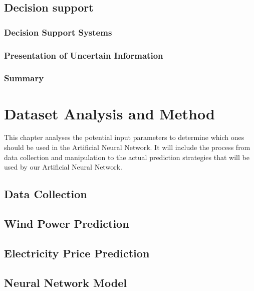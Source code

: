 \documentclass[twoside,11pt,openright]{report}
\begin{document}
\newpage

\section{Decision support}
\subsection{Decision Support Systems}

\subsection{Presentation of Uncertain Information}

\subsection{Summary}



\chapter{Dataset Analysis and Method}
This chapter analyses the potential input parameters to determine which ones should be used in the Artificial Neural Network. It will include the process from data collection and manipulation to the actual prediction strategies that will be used by our Artificial Neural Network. 
\label{ch:theANNs}
\section{Data Collection}

\section{Wind Power Prediction}

\section{Electricity Price Prediction}

\section{Neural Network Model}




\end{document}
